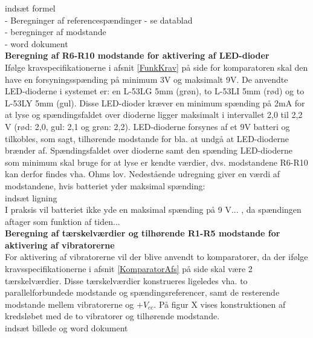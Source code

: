 indsæt formel \\

- Beregninger af referencespændinger - se datablad \\
- beregninger af modstande \\
- word dokument \\

\noindent\textbf{Beregning af R6-R10 modstande for aktivering af LED-dioder} \\
Ifølge kravspecifikationerne i afsnit \ref{FunkKrav}  på side \pageref{FunkKrav} for komparatoren skal den have en forsyningsspænding på minimum 3V og maksimalt 9V. %
De anvendte LED-dioderne i systemet er: en L-53LG 5mm (grøn), to L-53LI 5mm (rød) og to L-53LY 5mm (gul). Disse LED-dioder kræver en minimum spænding på 2mA for at lyse og spændingsfaldet over dioderne ligger maksimalt i intervallet 2,0 til 2,2 V (rød: 2,0, gul: 2,1 og grøn: 2,2). LED-dioderne forsynes af et 9V batteri og tilkobles, som sagt, tilhørende modstande for bla. at undgå at LED-dioderne brænder af. Spændingsfaldet over dioderne samt den spænding LED-dioderne som minimum skal bruge for at lyse er kendte værdier, dvs. modstandene R6-R10 kan derfor findes vha. Ohms lov. Nedestående udregning giver en værdi af modstandene, hvis batteriet yder maksimal spænding: \\

indsæt ligning \\

I praksis vil batteriet ikke yde en maksimal spænding på 9 V... , da spændingen aftager som funktion af tiden... \\

\noindent\textbf{Beregning af tærskelværdier og tilhørende R1-R5 modstande for aktivering af  vibratorerne} \\
For aktivering af vibratorerne vil der blive anvendt to komparatorer, da der ifølge kravsspecifikationerne i afsnit \ref{KomparatorAfs} på side \pageref{KomparatorAfs} skal være 2 tærskelværdier. Disse tærskelværdier konstrueres ligeledes vha. to parallelforbundede modstande og spændingsreferencer, samt de resterende modstande mellem vibratorerne og $+V_{cc}$. På figur X vises konstruktionen af kredsløbet med de to vibratorer og tilhørende modstande. \\

indsæt billede og word dokument \\

